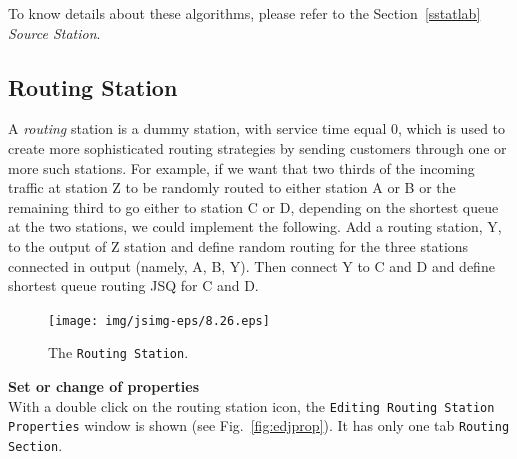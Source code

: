 \noindent To know details about these algorithms, please refer to the
Section~\ref{sstatlab} \emph{Source Station}.


\subsection{Routing Station}
 A \emph{routing} station is a dummy
station, with service time equal 0, which is used to create more
sophisticated routing strategies by sending customers through one
or more such stations. For example, if we want that two thirds of
the incoming traffic at station Z to be randomly routed to either
station A or B or the remaining third to go either to station C or
D, depending on the shortest queue at the two stations, we could
implement the following. Add a routing station, Y, to the output
of Z station and define random routing for the three stations
connected in output (namely, A, B, Y). Then connect Y to C and D
and define
shortest queue routing JSQ for C and D.\\
\begin{figure}[htb]
    \begin{center}
        \texttt{[image: img/jsimg-eps/8.26.eps]}
    \end{center}
    \caption{The \texttt{Routing Station}.}
    \label{fig:routstat}
\end{figure}

\noindent \textbf{Set or change of properties}\\ With a double click on the
routing station icon, the \texttt{Editing Routing Station
Properties} window is shown (see Fig.~\ref{fig:edjprop}).
It has only one tab \texttt{Routing Section}.\\


